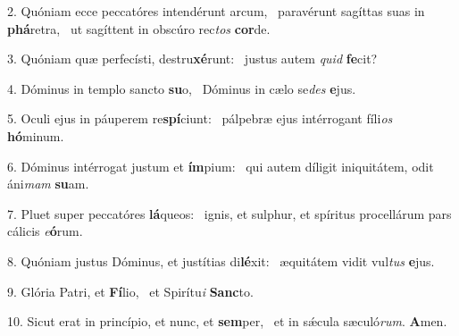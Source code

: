 2. Quóniam ecce peccatóres intendérunt arcum, \dag\  paravérunt sagíttas suas in \textbf{phá}retra, \ast\  ut sagíttent in obscúro rec\textit{tos} \textbf{cor}de.\

3. Quóniam quæ perfecísti, destru\textbf{xé}runt: \ast\  justus autem \textit{quid} \textbf{fe}cit?\

4. Dóminus in templo sancto \textbf{su}o, \ast\  Dóminus in cælo se\textit{des} \textbf{e}jus.\

5. Oculi ejus in páuperem re\textbf{spí}ciunt: \ast\  pálpebræ ejus intérrogant fíli\textit{os} \textbf{hó}minum.\

6. Dóminus intérrogat justum et \textbf{ím}pium: \ast\  qui autem díligit iniquitátem, odit áni\textit{mam} \textbf{su}am.\

7. Pluet super peccatóres \textbf{lá}queos: \ast\  ignis, et sulphur, et spíritus procellárum pars cálicis \textit{e}\textbf{ó}rum.\

8. Quóniam justus Dóminus, et justítias di\textbf{lé}xit: \ast\  æquitátem vidit vul\textit{tus} \textbf{e}jus.\

9. Glória Patri, et \textbf{Fí}lio, \ast\  et Spirítu\textit{i} \textbf{Sanc}to.\

10. Sicut erat in princípio, et nunc, et \textbf{sem}per, \ast\  et in sǽcula sæculó\textit{rum}. \textbf{A}men.\

